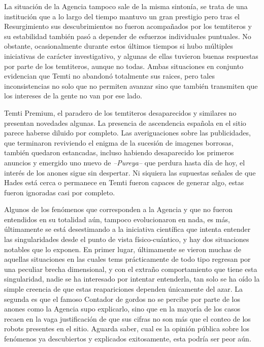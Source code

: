 \documentclass[
  spanish,
]{book}
\begin{document}
La situación de la Agencia tampoco sale de la misma sintonía, se trata de una institución que a lo largo del tiempo mantuvo un gran prestigio pero tras el Resurgimiento sus descubrimientos no fueron acompañados por los temtiteros y su estabilidad también pasó a depender de esfuerzos individuales puntuales. No obstante, ocasionalmente durante estos últimos tiempos si hubo múltiples iniciativas de carácter investigativo, y algunas de ellas tuvieron buenas respuestas por parte de los temtiteros, aunque no todas.
Ambas situaciones en conjunto evidencian que Temti no abandonó totalmente sus raices, pero tales inconsistencias no solo que no permiten avanzar sino que también transmiten que los intereses de la gente no van por ese lado.

Temti Premium, el paradero de los temtiteros desaparecidos y similares no presentan novedades algunas. La presencia de ascendencia española en el sitio parece haberse diluido por completo.
Las averiguaciones sobre las publicidades, que terminaron reviviendo el enigma de la sucesión de imagenes borrosas, también quedaron estancadas, incluso habiendo desaparecido los primeros anuncios y emergido uno nuevo de \emph{--Pureya--} que perdura hasta día de hoy, el interés de los anones sigue sin despertar. Ni siquiera las supuestas señales de que Hades está cerca o permanece en Temti fueron capaces de generar algo, estas fueron ignoradas casi por completo.

Algunos de los fenómenos que corresponden a la Agencia y que no fueron entendidos en su totalidad aún, tampoco evolucionaron en nada, es más, últimamente se está desestimando a la iniciativa científica que intenta entender las singularidades desde el punto de vista físico-cuántico, y hay dos situaciones notables que lo exponen. En primer lugar, últimamente se vieron muchas de aquellas situaciones en las cuales tems prácticamente de todo tipo regresan por una peculiar brecha dimensional, y con el extraño comportamiento que tiene esta singularidad, nadie se ha interesado por intentar entenderla, tan solo se ha oído la simple creencia de que estas reapariciones dependen únicamente del azar. La segunda es que el famoso Contador de gordos no se percibe por parte de los anones como la Agencia supo explicarlo, sino que en la mayoría de los casos recaen en la vaga justificación de que sus cifras no son más que el conteo de los robots presentes en el sitio. Aguarda saber, cual es la opinión pública sobre los fenómenos ya descubiertos y explicados exitosamente, esta podría ser peor aún.
\end{document}
